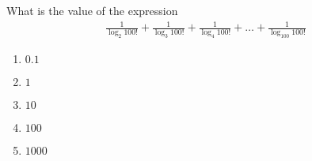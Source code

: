 What is the value of the expression
\begin{align*}
\frac{1}{\log_{2}100!}
+ \frac{1}{\log_{3}100!}
+ \frac{1}{\log_{4}100!}
+ \ldots 
+ \frac{1}{\log_{100}100!}
\end{align*}

\begin{enumerate}
\item $0.1$
\item $1$
\item $10$
\item $100$
\item $1000$
\end{enumerate}
